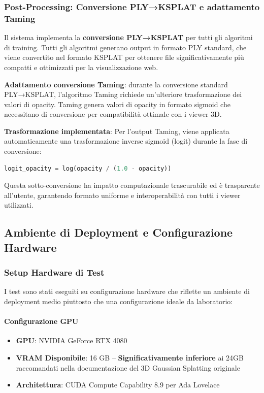 \subsubsection{Post-Processing: Conversione PLY→KSPLAT e adattamento Taming}

Il sistema implementa la \textbf{conversione PLY→KSPLAT} per tutti gli algoritmi di training. Tutti gli algoritmi generano output in formato PLY standard, che viene convertito nel formato KSPLAT per ottenere file significativamente più compatti e ottimizzati per la visualizzazione web.

\textbf{Adattamento conversione Taming}: durante la conversione standard PLY→KSPLAT, l'algoritmo Taming richiede un'ulteriore trasformazione dei valori di opacity. Taming genera valori di opacity in formato sigmoid che necessitano di conversione per compatibilità ottimale con i viewer 3D.

\textbf{Trasformazione implementata}: Per l'output Taming, viene applicata automaticamente una trasformazione inverse sigmoid (logit) durante la fase di conversione:
\begin{lstlisting}[language=Python, caption=Conversione opacity per Taming]
	logit_opacity = log(opacity / (1.0 - opacity))
\end{lstlisting}

Questa sotto-conversione ha impatto computazionale trascurabile ed è trasparente all'utente, garantendo formato uniforme e interoperabilità con tutti i viewer utilizzati.
\subsection{Ambiente di Deployment e Configurazione Hardware}
\label{subsec:ambiente_deployment}

\subsubsection{Setup Hardware di Test}

I test sono stati eseguiti su configurazione hardware che riflette un ambiente di deployment medio piuttosto che una configurazione ideale da laboratorio:

\paragraph{Configurazione GPU}
\begin{itemize}
	\item \textbf{GPU}: NVIDIA GeForce RTX 4080
	\item \textbf{VRAM Disponibile}: 16 GB -- \textbf{Significativamente inferiore} ai 24GB raccomandati nella documentazione del 3D Gaussian Splatting originale
	\item \textbf{Architettura}: CUDA Compute Capability 8.9 per Ada Lovelace
\end{itemize}

